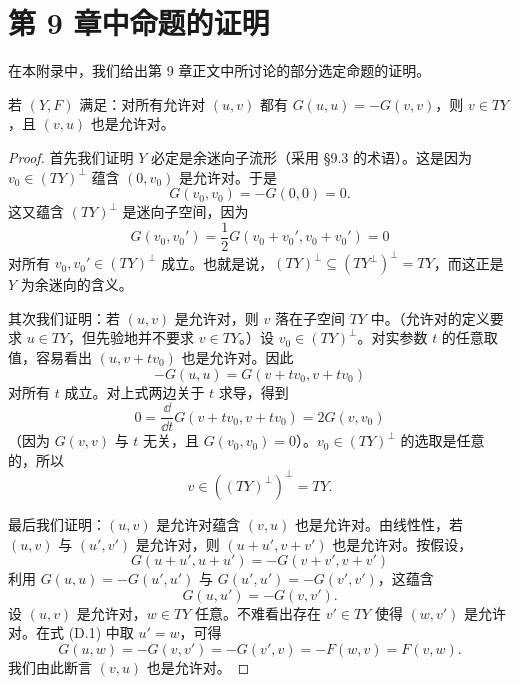 
\chapter{第 9 章中命题的证明}

在本附录中，我们给出第 9 章正文中所讨论的部分选定命题的证明。

\begin{proposition}[1] 若 $(Y,F)$ 满足：对所有允许对 $(u,v)$ 都有 $G(u,u)=-G(v,v)$，则 $v\in TY$，且 $(v,u)$ 也是允许对。\end{proposition}

\begin{proof}
首先我们证明 $Y$ 必定是余迷向子流形（采用 §9.3 的术语）。这是因为 $v_0\in(TY)^\perp$ 蕴含 $(0,v_0)$ 是允许对。于是
\[
  G(v_0,v_0)=-G(0,0)=0 .
\]
这又蕴含 $(TY)^\perp$ 是迷向子空间，因为
\[
  G(v_0,v_0')=\frac{1}{2}G(v_0+v_0',v_0+v_0')=0
\]
对所有 $v_0,v_0'\in(TY)^\perp$ 成立。也就是说，$(TY)^\perp\subseteq(TY^\perp)^\perp=TY$，而这正是 $Y$ 为余迷向的含义。


其次我们证明：若 $(u,v)$ 是允许对，则 $v$ 落在子空间 $TY$ 中。（允许对的定义要求 $u\in TY$，但先验地并不要求 $v\in TY$。）设 $v_0\in(TY)^\perp$。对实参数 $t$ 的任意取值，容易看出 $(u,v+tv_0)$ 也是允许对。因此
\[
  -G(u,u)=G(v+tv_0,v+tv_0)
\]
对所有 $t$ 成立。对上式两边关于 $t$ 求导，得到
\[
  0=\frac{\dd}{\dd t}G(v+tv_0,v+tv_0)=2G(v,v_0)
\]
（因为 $G(v,v)$ 与 $t$ 无关，且 $G(v_0,v_0)=0$）。$v_0\in(TY)^\perp$ 的选取是任意的，所以
\[
  v\in((TY)^\perp)^\perp=TY .
\]


最后我们证明：$(u,v)$ 是允许对蕴含 $(v,u)$ 也是允许对。由线性性，若 $(u,v)$ 与 $(u',v')$ 是允许对，则 $(u+u',v+v')$ 也是允许对。按假设，
\[
  G(u+u',u+u')=-G(v+v',v+v')
\]
利用 $G(u,u)=-G(u',u')$ 与 $G(u',u')=-G(v',v')$，这蕴含
\begin{equation}
  G(u,u')=-G(v,v') . \tag{D.1}
\end{equation}
设 $(u,v)$ 是允许对，$w\in TY$ 任意。不难看出存在 $v'\in TY$ 使得 $(w,v')$ 是允许对。在式 (D.1) 中取 $u'=w$，可得
\[
  G(u,w)=-G(v,v')=-G(v',v)=-F(w,v)=F(v,w).
\]
我们由此断言 $(v,u)$ 也是允许对。
\end{proof}

